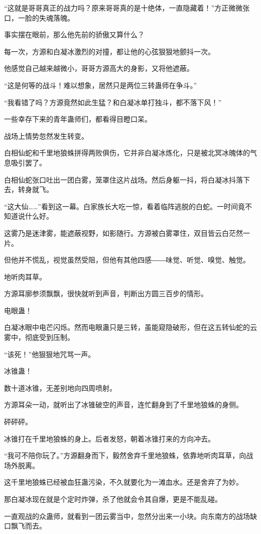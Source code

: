 \begin{this_body}
“这就是哥哥真正的战力吗？原来哥哥真的是十绝体，一直隐藏着！”方正微微张口，一脸的失魂落魄。

事实摆在眼前，那么他先前的骄傲又算什么？

每一次，方源和白凝冰激烈的对撞，都让他的心弦狠狠地颤抖一次。

他感觉自己越来越微小，哥哥方源高大的身影，又将他遮蔽。

“这是何等的战斗！难以想象，居然只是两位三转蛊师在争斗。”

“我看错了吗？方源竟然如此生猛？和白凝冰单打独斗，都不落下风！”

一些幸存下来的青年蛊师们，都看得目瞪口呆。

战场上情势忽然发生转变。

白相仙蛇和千里地狼蛛拼得两败俱伤，它并非白凝冰炼化，只是被北冥冰魄体的气息吸引罢了。

白相仙蛇张口吐出一团白雾，笼罩住这片战场。然后身躯一抖，将白凝冰抖落下去，转身就飞。

“这大仙……”看到这一幕。白家族长大吃一惊，看着临阵逃脱的白蛇。一时间竟不知道说什么好。

这雾乃是迷津雾，能遮蔽视野，如影随行。方源被白雾罩住，双目皆云白茫然一片。

但他并不慌乱，视觉虽然受阻，但他有其他四感――味觉、听觉、嗅觉、触觉。

地听肉耳草。

方源耳廓参须飘飘，很快就听到声音，判断出方圆三百步的情形。

电眼蛊！

白凝冰眼中电芒闪烁。然而电眼蛊只是三转，虽能窥隐破形，但在这五转仙蛇的云雾中，彻底受到压制。

“该死！”他狠狠地咒骂一声。

冰锥蛊！

数十道冰锥，无差别地向四周喷射。

方源耳朵一动，就听出了冰锥破空的声音，连忙翻身到了千里地狼蛛的身侧。

砰砰砰。

冰锥打在千里地狼蛛的身上。后者发怒，朝着冰锥打来的方向冲去。

“我可不陪你玩了。”方源翻身而下，毅然舍弃千里地狼蛛，依靠地听肉耳草，向战场外脱离。

这千里地狼蛛已经被血狂蛊污染，不久就要化为一滩血水。还是舍弃了为妙。

那白凝冰现在就是个定时炸弹，杀了他就会令其自爆，更是不能乱碰。

一直观战的众蛊师，就看到一团云雾当中，忽然分出来一小块。向东南方的战场缺口飘飞而去。


\end{this_body}
